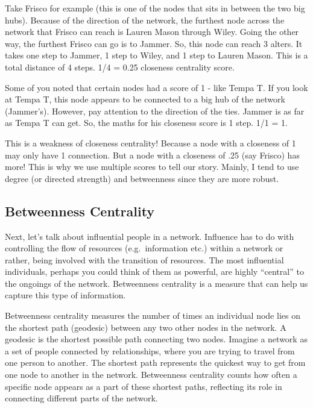 \documentclass[
  letterpaper,
  DIV=11,
  numbers=noendperiod]{scrreprt}
\begin{document}
Take Frisco for example (this is one of the nodes that sits in between
the two big hubs). Because of the direction of the network, the furthest
node across the network that Frisco can reach is Lauren Mason through
Wiley. Going the other way, the furthest Frisco can go is to Jammer. So,
this node can reach 3 alters. It takes one step to Jammer, 1 step to
Wiley, and 1 step to Lauren Mason. This is a total distance of 4 steps.
1/4 = 0.25 closeness centrality score.

Some of you noted that certain nodes had a score of 1 - like Tempa T. If
you look at Tempa T, this node appears to be connected to a big hub of
the network (Jammer's). However, pay attention to the direction of the
ties. Jammer is as far as Tempa T can get. So, the maths for his
closeness score is 1 step. 1/1 = 1.

This is a weakness of closeness centrality! Because a node with a
closeness of 1 may only have 1 connection. But a node with a closeness
of .25 (say Frisco) has more! This is why we use multiple scores to tell
our story. Mainly, I tend to use degree (or directed strength) and
betweenness since they are more robust.

\subsection{Betweenness Centrality}\label{betweenness-centrality}

Next, let's talk about influential people in a network. Influence has to
do with controlling the flow of resources (e.g.~information etc.) within
a network or rather, being involved with the transition of resources.
The most influential individuals, perhaps you could think of them as
powerful, are highly ``central'' to the ongoings of the network.
Betweenness centrality is a measure that can help us capture this type
of information.

Betweenness centrality measures the number of times an individual node
lies on the shortest path (geodesic) between any two other nodes in the
network. A geodesic is the shortest possible path connecting two nodes.
Imagine a network as a set of people connected by relationships, where
you are trying to travel from one person to another. The shortest path
represents the quickest way to get from one node to another in the
network. Betweenness centrality counts how often a specific node appears
as a part of these shortest paths, reflecting its role in connecting
different parts of the network.
\end{document}
